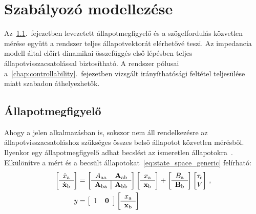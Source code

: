 \chapter{Szabályozó modellezése}\label{chap:controller}

Az~\ref{chap:observer}.\ fejezetben levezetett állapotmegfigyelő és a szögelfordulás közvetlen mérése
együtt a rendszer teljes állapotvektorát elérhetővé teszi. Az impedancia modell által előírt dinamikai összefüggés
első lépésben teljes állapotvisszacsatolással biztosítható. A rendszer pólusai a~\ref{chap:controllability}.\ fejezetben
vizsgált irányíthatósági feltétel teljesülése miatt szabadon áthelyezhetők.

\section{Állapotmegfigyelő}\label{chap:observer}
Ahogy a jelen alkalmazásban is, sokszor nem áll rendelkezésre az állapotvisszacsatoláshoz szükséges 
összes belső állapotot közvetlen mérésből. Ilyenkor egy állapotmegfigyelő adhat becslést az ismeretlen 
állapotokra~\cite{kalman1960new,OgataModernControl}. Elkülönítve a mért és a becsült állapotokat~\eqref{eq:state_space_generic} 
felírható:
\begin{equation}\label{eq:observer_state}
    \begin{split}
    \left[\begin{array}{c}
        \dot x_{\mathrm{a}} \\ \hline
        \dot{\mathbf{x}}_{\mathrm{b}}
    \end{array}\right]
    &=
    \left[\begin{array}{c|c}
        A_{\mathrm{aa}} & \mathbf{A}_{\mathrm{a b}} \\ \hline
        \mathbf{A}_{\mathrm{ba}} & \mathbf{A}_{\mathrm{bb}}
    \end{array}\right]
    \left[\begin{array}{c}
        x_{\mathrm{a}} \\ \hline
        \mathbf{x}_{\mathrm{b}}
    \end{array}\right]
    +
    \left[\begin{array}{c}
        B_{\mathrm{a}} \\ \hline
        \mathbf{B}_{\mathrm{b}}
    \end{array}\right]
    \begin{bmatrix}
        \tau_{\mathrm{e}} \\
        V \\
    \end{bmatrix}\,,\\
    y &= 
    \left[\begin{array}{c|c}
        1 & \mathbf{0}
    \end{array}\right]
    \left[\begin{array}{c}
        x_{\mathrm{a}} \\ \hline
        \mathbf{x}_{\mathrm{b}}
    \end{array}\right]
    \end{split}
\end{equation}
